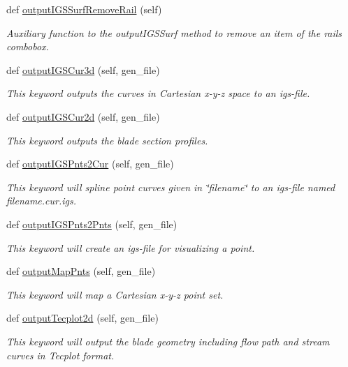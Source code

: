 \begin{DoxyCompactItemize}
def \hyperlink{a00071_ae5847a1434bc82a396cebfb20911db56}{output\+I\+G\+S\+Surf\+Remove\+Rail} (self)
\begin{DoxyCompactList}\small\item\em Auxiliary function to the output\+I\+G\+S\+Surf method to remove an item of the rails combobox. \end{DoxyCompactList}\item 
def \hyperlink{a00071_a394d61e8d66fde036f84746086d6c687}{output\+I\+G\+S\+Cur3d} (self, gen\+\_\+file)
\begin{DoxyCompactList}\small\item\em This keyword outputs the curves in Cartesian x-\/y-\/z space to an igs-\/file. \end{DoxyCompactList}\item 
def \hyperlink{a00071_ace84b07ce1416a3535068da6baa2e7d3}{output\+I\+G\+S\+Cur2d} (self, gen\+\_\+file)
\begin{DoxyCompactList}\small\item\em This keyword outputs the blade section profiles. \end{DoxyCompactList}\item 
def \hyperlink{a00071_a60dc6e0ccec5f096ee68f997079abef3}{output\+I\+G\+S\+Pnts2\+Cur} (self, gen\+\_\+file)
\begin{DoxyCompactList}\small\item\em This keyword will spline point curves given in \char`\"{}filename\char`\"{} to an igs-\/file named filename.\+cur.\+igs. \end{DoxyCompactList}\item 
def \hyperlink{a00071_a07862d0aa6332b54008342a24c2e30a3}{output\+I\+G\+S\+Pnts2\+Pnts} (self, gen\+\_\+file)
\begin{DoxyCompactList}\small\item\em This keyword will create an igs-\/file for visualizing a point. \end{DoxyCompactList}\item 
def \hyperlink{a00071_abfeabe3a35852a2ce2ddf16765aef7eb}{output\+Map\+Pnts} (self, gen\+\_\+file)
\begin{DoxyCompactList}\small\item\em This keyword will map a Cartesian x-\/y-\/z point set. \end{DoxyCompactList}\item 
def \hyperlink{a00071_a63d4bad24ed0fab617c1676db04a67e7}{output\+Tecplot2d} (self, gen\+\_\+file)
\begin{DoxyCompactList}\small\item\em This keyword will output the blade geometry including flow path and stream curves in Tecplot format. \end{DoxyCompactList}\item 

\end{DoxyCompactItemize}
